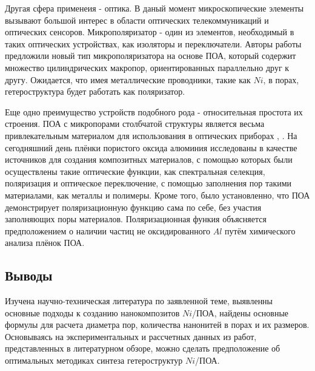Другая сфера применеия - оптика. В даный момент микроскопические элементы вызывают большой интерес в области оптических телекоммуникаций и оптических сенсоров. Микрополяризатор - один из элементов, необходимый в таких оптических устройствах, как изоляторы и переключатели. Авторы работы \cite{saito} предложили новый тип микрополяризатора на основе ПОА, который содержит множество цилиндрических макропор, ориентированных параллельно друг к другу. Ожидается, что имея металлические проводники, такие как $Ni$, в порах, гетероструктура будет работать как поляризатор.

Еще одно преимущество устройств подобного рода - относительная простота их строения.
ПОА с микропорами столбчатой структуры является весьма привлекательным материалом для использования в оптических приборах \cite{kolmychek}, \cite{kolmychek2}. На сегодняшний день плёнки пористого оксида алюминия исследованы в качестве источников для создания композитных материалов, с помощью которых были осуществлены такие оптические функции, как спектральная селекция, поляризация и оптическое переключение, с помощью заполнения пор такими материалами, как металлы и полимеры. Кроме того, было установленно, что ПОА демонстрирует поляризационную функцию сама по себе, без участия заполняющих поры материалов. Поляризационная функия объясняется предположением о наличии частиц не оксидированного $Al$ путём химического анализа плёнок ПОА.

\subsection{Выводы}

Изучена научно-техническая литература по заявленной теме, выявленны основные подходы к созданию нанокомпозитов $Ni$/ПОА, найдены основные формулы для расчета диаметра пор, количества нанонитей в порах и их размеров. 
Основываясь на экспериментальных и рассчетных данных из работ, представленных в литературном обзоре, можно сделать предположение об оптимальных методиках синтеза гетероструктур $Ni$/ПОА.

